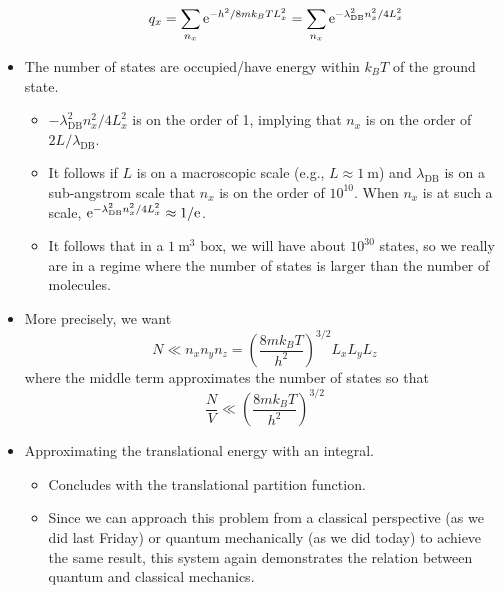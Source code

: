 \documentclass[../notes.tex]{subfiles}
\begin{document}
\begin{itemize}
\begin{itemize}
        \begin{equation*}
            q_x = \sum_{n_x}\e[-h^2/8mk_BTL_x^2]
            = \sum_{n_x}\e[-\lambda_\text{DB}^2n_x^2/4L_x^2]
        \end{equation*}
    \end{itemize}
    \item The number of states are occupied/have energy within $k_BT$ of the ground state.
    \begin{itemize}
        \item $-\lambda_\text{DB}^2n_x^2/4L_x^2$ is on the order of 1, implying that $n_x$ is on the order of $2L/\lambda_\text{DB}$.
        \item It follows if $L$ is on a macroscopic scale (e.g., $L\approx\SI{1}{\meter}$) and $\lambda_\text{DB}$ is on a sub-angstrom scale that $n_x$ is on the order of $10^{10}$. When $n_x$ is at such a scale, $\e[-\lambda_\text{DB}^2n_x^2/4L_x^2]\approx 1/\e$.
        \item It follows that in a $\SI{1}{\cubic\meter}$ box, we will have about $10^{30}$ states, so we really are in a regime where the number of states is larger than the number of molecules.
    \end{itemize}
    \item More precisely, we want
    \begin{equation*}
        N \ll n_xn_yn_z = \left( \frac{8mk_BT}{h^2} \right)^{3/2}L_xL_yL_z
    \end{equation*}
    where the middle term approximates the number of states so that
    \begin{equation*}
        \frac{N}{V} \ll \left( \frac{8mk_BT}{h^2} \right)^{3/2}
    \end{equation*}
    \item Approximating the translational energy with an integral.
    \begin{itemize}
        \item Concludes with the translational partition function.
        \item Since we can approach this problem from a classical perspective (as we did last Friday) or quantum mechanically (as we did today) to achieve the same result, this system again demonstrates the relation between quantum and classical mechanics.
    \end{itemize}
\end{itemize}
\end{document}
